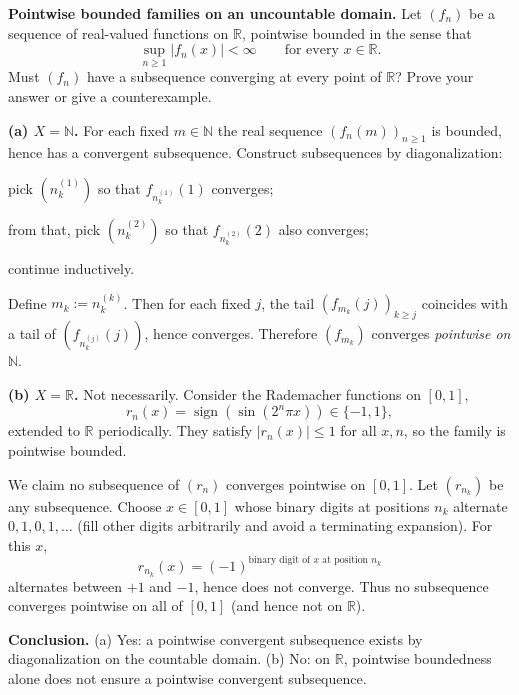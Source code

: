\begin{problem}[CP-IV-0018]
\label{prob:cp-iv-0018}
\par\noindent\textbf{Pointwise bounded families on an uncountable domain.}\quad
Let $(f_n)$ be a sequence of real-valued functions on $\mathbb R$,
pointwise bounded in the sense that
\[
\sup_{n\ge1}|f_n(x)|<\infty\qquad\text{for every }x\in\mathbb R.
\]
Must $(f_n)$ have a subsequence converging at every point of $\mathbb R$?
Prove your answer or give a counterexample.
\end{problem}

\begin{solution}
\par\medskip\noindent\textbf{(a) $X=\mathbb{N}$.}\quad 
For each fixed $m\in\mathbb{N}$ the real sequence $(f_n(m))_{n\ge1}$ is bounded, hence has a convergent subsequence.
Construct subsequences by diagonalization:

	\par\noindent\textbullet\quad pick $(n^{(1)}_k)$ so that $f_{n^{(1)}_k}(1)$ converges;
	\par\noindent\textbullet\quad from that, pick $(n^{(2)}_k)$ so that $f_{n^{(2)}_k}(2)$ also converges;
	\par\noindent\textbullet\quad continue inductively.

Define $m_k:=n^{(k)}_k$. Then for each fixed $j$, the tail $(f_{m_k}(j))_{k\ge j}$ coincides with a tail of $(f_{n^{(j)}_k}(j))$, hence converges. Therefore $(f_{m_k})$ converges \emph{pointwise on $\mathbb{N}$}.

\par\medskip\noindent\textbf{(b) $X=\mathbb{R}$.}\quad 
Not necessarily. Consider the Rademacher functions on $[0,1]$,
\[
r_n(x)=\operatorname{sign}(\sin(2^n\pi x))\in\{-1,1\},
\]
extended to $\mathbb{R}$ periodically. They satisfy $|r_n(x)|\le 1$ for all $x,n$, so the family is pointwise bounded.

We claim no subsequence of $(r_n)$ converges pointwise on $[0,1]$. Let $(r_{n_k})$ be any subsequence. Choose $x\in[0,1]$ whose binary digits at positions $n_k$ alternate $0,1,0,1,\dots$ (fill other digits arbitrarily and avoid a terminating expansion). For this $x$,
\[
r_{n_k}(x)=(-1)^{\text{binary digit of $x$ at position $n_k$}}
\]
alternates between $+1$ and $-1$, hence does not converge. Thus no subsequence converges pointwise on all of $[0,1]$ (and hence not on $\mathbb{R}$).

\par\medskip\noindent\textbf{Conclusion.}\quad 
(a) Yes: a pointwise convergent subsequence exists by diagonalization on the countable domain.
(b) No: on $\mathbb{R}$, pointwise boundedness alone does not ensure a pointwise convergent subsequence.
\end{solution}

